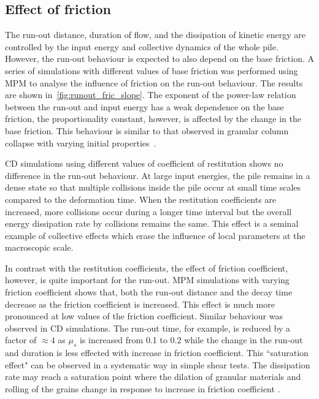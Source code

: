 \subsection{Effect of friction}
\label{sec:parameters}

The run-out distance, duration of flow, and the dissipation of kinetic energy 
are controlled by the input energy and collective dynamics of the whole pile. 
However, the run-out behaviour is expected to also depend on the base friction. 
A series of simulations with different values of base friction was performed 
using MPM to analyse the influence of friction on the run-out behaviour. The 
results are shown in~\cref{fig:runout_fric_slope}. The exponent of the 
power-law relation between the run-out and input energy has a weak dependence 
on the base friction, the proportionality constant, however, is affected by the 
change in the base friction. This behaviour is similar to that observed in 
granular column collapse with varying initial 
properties~\citep{Balmforth2005,Lajeunesse2005}. 

CD simulations using different values of coefficient of restitution shows no 
difference in the run-out behaviour. At large input energies, the pile remains 
in a dense state so that multiple collisions inside the pile occur at small 
time scales compared to the deformation time. When the restitution coefficients 
are increased, more collisions occur during a longer time interval but the 
overall energy dissipation rate by collisions remains the same. This effect is 
a seminal example of collective effects which erase the influence of local 
parameters at the macroscopic scale.

In contrast with the restitution coefficients, the effect of friction 
coefficient, however, is quite important for the run-out. MPM simulations with 
varying friction coefficient shows that, both the run-out distance and the 
decay time decrease as the friction coefficient is increased. This 
effect is much more pronounced at low values of the friction coefficient. 
Similar behaviour was observed in CD simulations. The run-out time, for 
example, is reduced by a factor of $\approx 4$ as $\mu_s$ is increased from 0.1 
to 0.2 while the change in the run-out and duration is less effected with 
increase in friction coefficient. This ``saturation effect" 
can be observed in a systematic way in simple shear tests. The dissipation rate 
may reach a saturation point where the dilation of granular materials and 
rolling of the grains change in response to increase in friction coefficient 
\cite{Estrada2008}.

